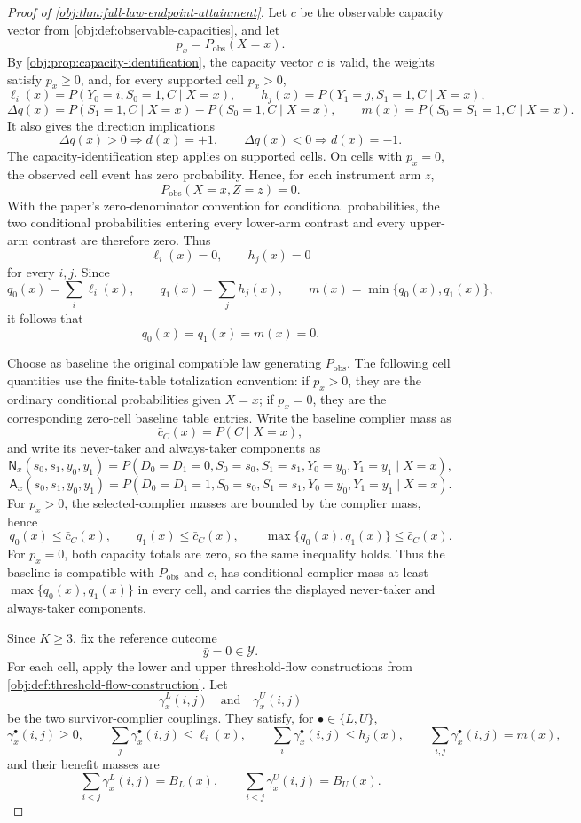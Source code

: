 \begin{proof}[Proof of \cref{obj:thm:full-law-endpoint-attainment}]
Let \(c\) be the observable capacity vector from \cref{obj:def:observable-capacities}, and let
\[
p_x=P_{\mathrm{obs}}(X=x).
\]
By \cref{obj:prop:capacity-identification}, the capacity vector \(c\) is valid, the weights satisfy \(p_x\ge 0\), and, for every supported cell \(p_x>0\),
\[
\ell_i(x)=P(Y_0=i,S_0=1,C\mid X=x),
\qquad
h_j(x)=P(Y_1=j,S_1=1,C\mid X=x),
\]
\[
\Delta q(x)=P(S_1=1,C\mid X=x)-P(S_0=1,C\mid X=x),
\qquad
m(x)=P(S_0=S_1=1,C\mid X=x).
\]
It also gives the direction implications
\[
\Delta q(x)>0\Rightarrow d(x)=+1,
\qquad
\Delta q(x)<0\Rightarrow d(x)=-1.
\]
The capacity-identification step applies on supported cells.  On cells with \(p_x=0\), the observed cell event has zero probability.  Hence, for each instrument arm \(z\),
\[
P_{\mathrm{obs}}(X=x,Z=z)=0.
\]
With the paper's zero-denominator convention for conditional probabilities, the two conditional probabilities entering every lower-arm contrast and every upper-arm contrast are therefore zero.  Thus
\[
\ell_i(x)=0,\qquad h_j(x)=0
\]
for every \(i,j\).  Since
\[
q_0(x)=\sum_i\ell_i(x),\qquad
q_1(x)=\sum_j h_j(x),
\qquad
m(x)=\min\{q_0(x),q_1(x)\},
\]
it follows that
\[
q_0(x)=q_1(x)=m(x)=0.
\]

Choose as baseline the original compatible law generating \(P_{\mathrm{obs}}\).  The following cell quantities use the finite-table totalization convention: if \(p_x>0\), they are the ordinary conditional probabilities given \(X=x\); if \(p_x=0\), they are the corresponding zero-cell baseline table entries.  Write the baseline complier mass as
\[
\bar c_C(x)=P(C\mid X=x),
\]
and write its never-taker and always-taker components as
\[
\mathsf N_x(s_0,s_1,y_0,y_1)
=
P(D_0=D_1=0,S_0=s_0,S_1=s_1,Y_0=y_0,Y_1=y_1\mid X=x),
\]
\[
\mathsf A_x(s_0,s_1,y_0,y_1)
=
P(D_0=D_1=1,S_0=s_0,S_1=s_1,Y_0=y_0,Y_1=y_1\mid X=x).
\]
For \(p_x>0\), the selected-complier masses are bounded by the complier mass, hence
\[
q_0(x)\le \bar c_C(x),
\qquad
q_1(x)\le \bar c_C(x),
\qquad
\max\{q_0(x),q_1(x)\}\le \bar c_C(x).
\]
For \(p_x=0\), both capacity totals are zero, so the same inequality holds.  Thus the baseline is compatible with \(P_{\mathrm{obs}}\) and \(c\), has conditional complier mass at least \(\max\{q_0(x),q_1(x)\}\) in every cell, and carries the displayed never-taker and always-taker components. %

Since \(K\ge 3\), fix the reference outcome
\[
\bar y=0\in\mathcal Y.
\]
For each cell, apply the lower and upper threshold-flow constructions from \cref{obj:def:threshold-flow-construction}.  Let
\[
\gamma^L_x(i,j)
\quad\text{and}\quad
\gamma^U_x(i,j)
\]
be the two survivor-complier couplings.  They satisfy, for \(\bullet\in\{L,U\}\),
\[
\gamma^\bullet_x(i,j)\ge 0,\qquad
\sum_j\gamma^\bullet_x(i,j)\le \ell_i(x),\qquad
\sum_i\gamma^\bullet_x(i,j)\le h_j(x),\qquad
\sum_{i,j}\gamma^\bullet_x(i,j)=m(x),
\]
and their benefit masses are
\[
\sum_{i<j}\gamma^L_x(i,j)=B_L(x),
\qquad
\sum_{i<j}\gamma^U_x(i,j)=B_U(x).
\]


\end{proof}
